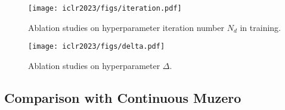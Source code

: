 \documentclass{article} %
\newcommand{\revision}[1]{{#1}}
\begin{document}
\begin{figure}[!htb]
    \centering
    \texttt{[image: iclr2023/figs/iteration.pdf]}
    \caption{Ablation studies on hyperparameter iteration number $N_d$ in training.}
    \label{fig:abiteration}
\end{figure}

\begin{figure}[!htb]
    \centering
    \texttt{[image: iclr2023/figs/delta.pdf]}
    \caption{Ablation studies on hyperparameter $\Delta$.}
    \label{fig:abdelta}
\end{figure}


\subsection{\revision{Comparison with Continuous Muzero}}
\end{document}
